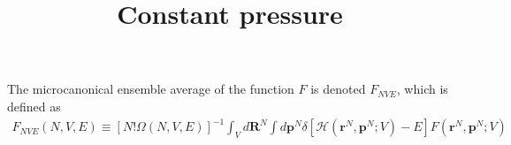 \documentclass{article}
\title{Constant pressure}
\begin{document}
The microcanonical ensemble average of the function $F$ is denoted $F_{NVE}$, which is defined as
\begin{align}
F_{NVE}(N,V,E)\equiv [N!\Omega(N,V,E)]^{-1}\int_Vd\textbf{R}^N\int d\textbf{p}^N\delta[\mathscr{H}(\textbf{r}^N,\textbf{p}^N;V)-E]F(\textbf{r}^N,\textbf{p}^N;V)
\end{align}
\end{document}
